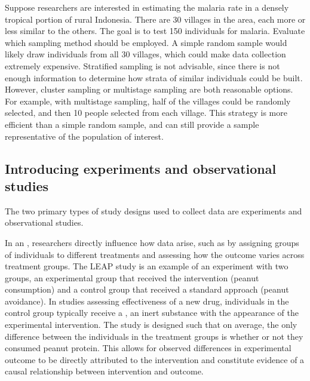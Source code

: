 
\begin{examplewrap}
\begin{nexample}{Suppose researchers are interested in estimating the malaria rate in a densely tropical portion of rural Indonesia. There are 30 villages in the area, each more or less similar to the others. The goal is to test 150 individuals for malaria. Evaluate which sampling method should be employed.}
	A simple random sample would likely draw individuals from all 30 villages, which could make data collection extremely expensive. Stratified sampling is not advisable, since there is not enough information to determine how strata of similar individuals could be built. However, cluster sampling or multistage sampling are both reasonable options. For example, with multistage sampling, half of the villages could be randomly selected, and then 10 people selected from each village. This strategy is more efficient than a simple random sample, and can still provide a sample representative of the population of interest.
\end{nexample}
\end{examplewrap}


\subsection{Introducing experiments and observational studies}

The two primary types of study designs used to collect data are experiments and observational studies.

In an , researchers directly influence how data arise, such as by assigning groups of individuals to different treatments and assessing how the outcome varies across treatment groups. The LEAP study is an example of an experiment with two groups, an experimental group that received the intervention (peanut consumption) and a control group that received a standard approach (peanut avoidance). In studies assessing effectiveness of a new drug, individuals in the control group typically receive a , an inert substance with the appearance of the experimental intervention. The study is designed such that on average, the only difference between the individuals in the treatment groups is whether or not they consumed peanut protein. This allows for observed differences in experimental outcome to be directly attributed to the intervention and constitute evidence of a causal relationship between intervention and outcome. 

